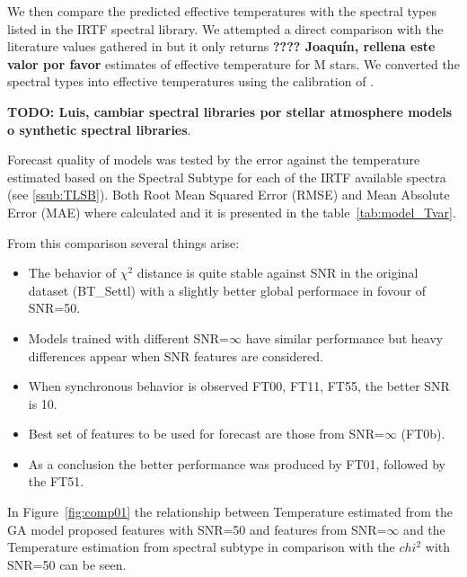 We then compare the predicted effective temperatures with the spectral
types listed in the IRTF spectral library. We attempted a direct
comparison with the literature values gathered in \cite{cesetti} but
it only returns {\bf ???? Joaquín, rellena este valor por favor}
estimates of effective temperature for M stars. We converted the
spectral types into effective temperatures using the calibration
of \cite{2009ApJ...702..154S}.

{\bf TODO: Luis, cambiar spectral libraries por stellar atmosphere
models o synthetic spectral libraries}.

Forecast quality of models was tested by the error against the
temperature estimated based on the Spectral Subtype for each of the
IRTF available spectra (see \ref{ssub:TLSB}).  Both Root Mean Squared
Error (RMSE) and Mean Absolute Error (MAE) where calculated and it is
presented in the table~\ref{tab:model_Tvar}.

From this comparison several things arise:
\begin{itemize}
 \item {The behavior of $\chi^2$ distance is quite stable against SNR 
	in the original dataset (BT\_Settl) with a slightly better global 
	performace in fovour of SNR=50.}
 \item {Models trained with different SNR=$\infty$ have similar performance but heavy 
	differences appear when SNR features are considered.}
 \item {When synchronous behavior is observed FT00, FT11, FT55, the better SNR is 10.}
 \item {Best set of features to be used for forecast are those from SNR=$\infty$ (FT0b).}
 \item {As a conclusion the better performance was produced by FT01, followed by the FT51.}
\end{itemize}

In Figure~\ref{fig:comp01} the relationship between Temperature
estimated from the GA model proposed features with SNR=50 and features
from SNR=$\infty$ and the Temperature estimation from spectral subtype
in comparison with the $chi^2$ with SNR=50 can be seen.

